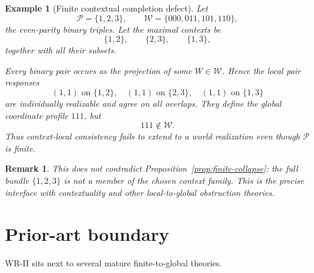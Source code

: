 \documentclass[11pt]{article}
\newtheorem{example}[definition]{Example}
\newtheorem{remark}[definition]{Remark}
\newcommand{\W}{\mathcal W}
\newcommand{\Pcal}{\mathcal P}
\begin{document}
\begin{example}[Finite contextual completion defect]
Let
\[
\Pcal=\{1,2,3\},
\qquad
\W=\{000,011,101,110\},
\]
the even-parity binary triples. Let the maximal contexts be
\[
\{1,2\},\qquad \{2,3\},\qquad \{1,3\},
\]
together with all their subsets.

Every binary pair occurs as the projection of some $W\in\W$. Hence the local
pair responses
\[
(1,1)\text{ on }\{1,2\},\quad
(1,1)\text{ on }\{2,3\},\quad
(1,1)\text{ on }\{1,3\}
\]
are individually realizable and agree on all overlaps. They define the global
coordinate profile $111$, but
\[
111\notin\W.
\]
Thus context-local consistency fails to extend to a world realization even
though $\Pcal$ is finite.
\end{example}

\begin{remark}
This does not contradict Proposition~\ref{prop:finite-collapse}: the full
bundle $\{1,2,3\}$ is not a member of the chosen context family. This is the
precise interface with contextuality and other local-to-global obstruction
theories.
\end{remark}

\section{Prior-art boundary}

WR-II sits next to several mature finite-to-global theories.
\end{document}
